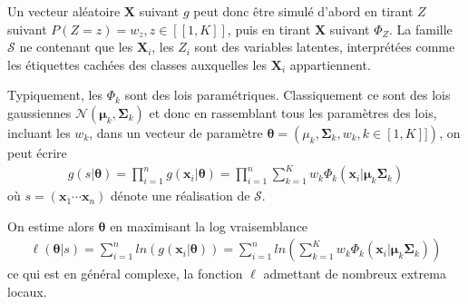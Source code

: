 \documentclass[letterpaper,10pt,english]{jupyterBook}
\begin{document}
\sphinxAtStartPar
Un vecteur aléatoire \(\mathbf X\) suivant \(g\) peut donc être simulé d’abord en tirant \(Z\) suivant \(P(Z=z)=w_z,z\in[\![1,K]\!]\), puis en tirant \(\mathbf X\) suivant \(\Phi_Z\). La famille \(\mathcal S\) ne contenant que les \(\mathbf X_i\), les \(Z_i\) sont des variables latentes, interprétées comme les étiquettes cachées des classes auxquelles les \(\mathbf X_i\) appartiennent.

\sphinxAtStartPar
Typiquement, les \(\Phi_k\) sont des lois paramétriques. Classiquement ce sont des lois gaussiennes \(\mathcal N(\boldsymbol \mu_k,\boldsymbol \Sigma_k)\) et donc en rassemblant tous les paramètres des lois, incluant les \(w_k\), dans un vecteur de paramètre \(\boldsymbol \theta = (\mu_k,\boldsymbol \Sigma_k,w_k,k\in[\!1,K]\!])\), on peut écrire
\begin{equation*}
\begin{split}g(s|\boldsymbol \theta) = \prod_{i=1}^n g(\mathbf x_i|\boldsymbol \theta) = \prod_{i=1}^n \displaystyle\sum_{k=1}^K w_k \Phi_k(\mathbf x_i|\boldsymbol\mu_k \boldsymbol\Sigma_k)\end{split}
\end{equation*}
\sphinxAtStartPar
où \(s=(\mathbf x_1\cdots \mathbf x_n)\) dénote une réalisation de \(\mathcal S\).

\sphinxAtStartPar
On estime alors \(\boldsymbol\theta\) en maximisant la log vraisemblance
\begin{equation*}
\begin{split}\ell(\boldsymbol\theta|s) = \displaystyle\sum_{i=1}^n ln(g(\mathbf x_i|\boldsymbol \theta)) = \displaystyle\sum_{i=1}^n ln \left ( \displaystyle\sum_{k=1}^K w_k \Phi_k(\mathbf x_i|\boldsymbol\mu_k \boldsymbol\Sigma_k) \right )\end{split}
\end{equation*}
\sphinxAtStartPar
ce qui est en général complexe, la fonction \(\ell\) admettant de nombreux extrema locaux.
\end{document}
